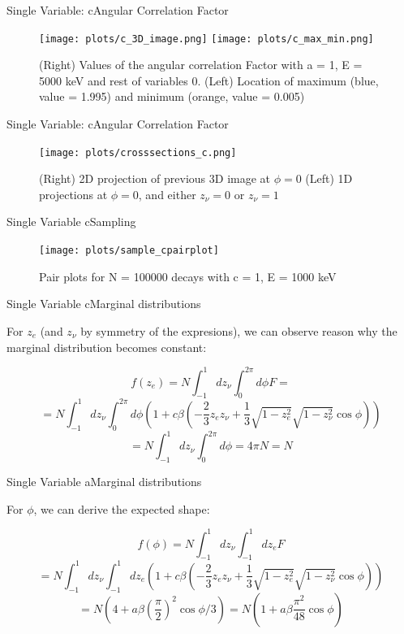 \documentclass{beamer}
\begin{document}
\begin{frame}{Single Variable: c}{Angular Correlation Factor}
	\begin{figure}
		\centering
		\texttt{[image: plots/c\_3D\_image.png]}
		\texttt{[image: plots/c\_max\_min.png]}
		\caption{(Right) Values of the angular correlation Factor with a = 1, E = 5000 keV and rest of variables 0. (Left) Location of maximum (blue, value = 1.995) and minimum (orange, value = 0.005)}	
	\end{figure}
\end{frame}
\begin{frame}{Single Variable: c}{Angular Correlation Factor}
	\begin{figure}
		\centering
		\texttt{[image: plots/crosssections\_c.png]}
		\caption{(Right) 2D projection of previous 3D image at $\phi = 0$ (Left) 1D projections at $\phi=0$, and either $z_\nu = 0$ or $z_\nu = 1$}
	\end{figure}
\end{frame}
\begin{frame}{Single Variable c}{Sampling}
	\begin{figure}
		\centering
		\texttt{[image: plots/sample\_cpairplot]}
		\caption{Pair plots for N = 100000 decays with c = 1, E = 1000 keV}
	\end{figure}
\end{frame}
\begin{frame}{Single Variable c}{Marginal distributions}

	
	For $z_e$ (and $z_\nu$ by symmetry of the expresions), we can observe reason why the marginal distribution becomes constant: 
	
	$$f(z_e) = N\int_{-1}^{1}dz_\nu\int_{0}^{2\pi}d\phi F =$$$$= N\int_{-1}^{1}dz_\nu\int_{0}^{2\pi}d\phi \left(1 + c\beta\left(-\frac 23 z_ez_\nu+\frac 13 \sqrt{1-z^2_e}\sqrt{1-z^2_\nu}\cos \phi\right)\right) $$$$ = N\int_{-1}^{1}dz_\nu\int_{0}^{2\pi}d\phi = 4\pi N = N $$

	
\end{frame}
\begin{frame}{Single Variable a}{Marginal distributions}
	
	
	For $\phi$, we can derive the expected shape: 
	
	$$f(\phi) = N\int_{-1}^{1}dz_\nu\int_{-1}^{1}dz_e F $$$$= N\int_{-1}^{1}dz_\nu\int_{-1}^{1}dz_e \left(1 + c\beta\left(-\frac 23 z_ez_\nu+\frac 13 \sqrt{1-z^2_e}\sqrt{1-z^2_\nu}\cos \phi\right)\right)$$$$ = N\left(4+a\beta\left(\frac{\pi}{2}\right)^2\cos\phi/3\right) = N\left(1+a\beta\frac{\pi^2}{48}\cos\phi\right)  $$
	
	
\end{frame}
\end{document}
